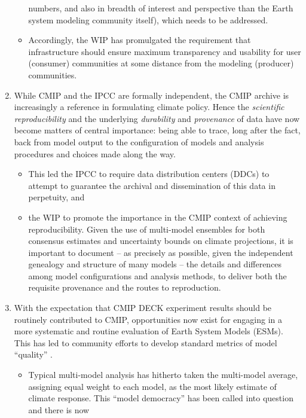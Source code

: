 \documentclass[gmd,manuscript]{copernicus}
\newcommand{\pipref}[1] {\citep{ref:#1}}
\begin{document}
\begin{enumerate}
\begin{itemize}
    numbers, and also in breadth of interest and perspective than the
    Earth system modeling community itself), which needs to be
    addressed.
  \item Accordingly, the WIP has promulgated the requirement that 
    infrastructure should ensure maximum transparency and usability
    for user (consumer) communities at some distance from the modeling
    (producer) communities.
  \end{itemize}
\item\label{repro} While CMIP and the IPCC are formally independent,
  the CMIP archive is increasingly a reference in formulating
  climate policy. Hence the \emph{scientific reproducibility}
  \pipref{collinstabak2014} and the underlying \emph{durability} and
  \emph{provenance} of data have now become matters of central
  importance: being able to trace, long after the fact, back from
  model output to the configuration of models and analysis procedures
  and choices made along the way.
  \begin{itemize}
  \item This led the IPCC to require data distribution centers (DDCs)
    to attempt to guarantee the archival and dissemination of this
    data in perpetuity, and
  \item the WIP to promote the importance in the CMIP context of
    achieving reproducibility. Given the use of multi-model ensembles
    for both consensus estimates and uncertainty bounds on climate
    projections, it is important to document -- as precisely as
    possible, given the independent genealogy and structure of many
    models -- the details and differences among model configurations
    and analysis methods, to deliver both the requisite provenance and
    the routes to reproduction.
  \end{itemize}
\item\label{analysis} With the expectation that CMIP DECK experiment
  results should be routinely contributed to CMIP, opportunities now
  exist for engaging in a more systematic and routine evaluation of
  Earth System Models (ESMs). This has led to community efforts to
  develop standard metrics of model ``quality''
  \citep{ref:eyringetal2016,ref:gleckleretal2016}.
  \begin{itemize}
  \item Typical multi-model analysis has hitherto taken the
    multi-model average, assigning equal weight to each model, as the
    most likely estimate of climate response. This ``model democracy''
    \pipref{knutti2010} has been called into question and there is now

\end{itemize}
\end{enumerate}
\end{document}
